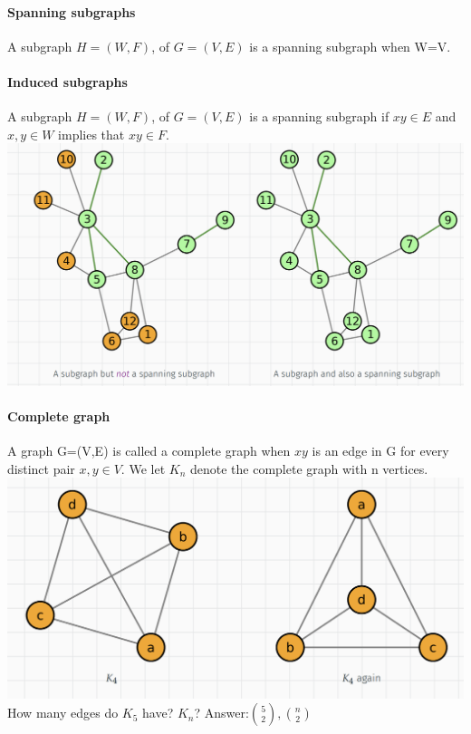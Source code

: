 \documentclass{article}
\begin{document}
\paragraph{Spanning subgraphs}
A subgraph $H=(W,F)$, of $G=(V,E)$ is a spanning subgraph when W=V.
\paragraph{Induced subgraphs}
A subgraph $H=(W,F)$, of $G=(V,E)$ is a spanning subgraph if $xy\in E$ and $x,y\in W$ implies that $xy\in F$.\newline
\includegraphics{0027}\newline
\paragraph{Complete graph}
A graph G=(V,E) is called a complete graph when $xy$ is an edge in G for every distinct pair $x,y\in V$.\newline
We let $K_n$ denote the complete graph with n vertices.\newline
\includegraphics{0028}\newline
How many edges do $K_5$ have? $K_n$?\newline
Answer:$\binom{5}{2},\binom{n}{2}$
\end{document}
